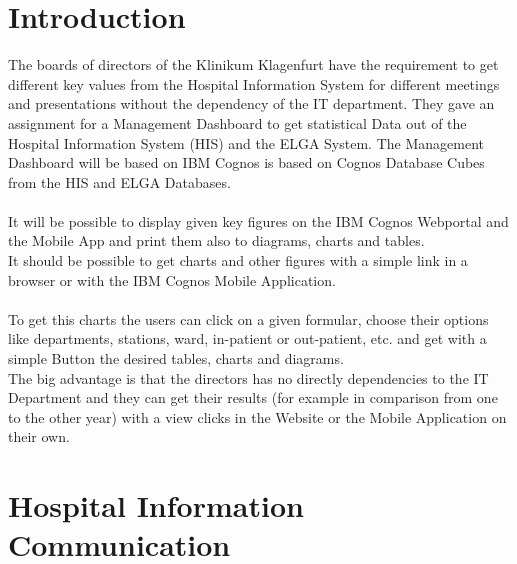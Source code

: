 \documentclass[a4paper]{article}
\begin{document}
	\section{Introduction}
	The boards of directors of the Klinikum Klagenfurt have the requirement to get
	different key values from the Hospital Information System for different
	meetings and presentations without the dependency of the IT department.
	They gave an assignment for a Management Dashboard to get statistical Data out
	of the Hospital Information System (HIS) and the ELGA System. The Management Dashboard
	will be based on IBM Cognos is based on Cognos Database Cubes from the HIS and
	ELGA Databases.\\
	\\
	It will be possible to display given key figures on the IBM Cognos
	Webportal and the Mobile App and print them also to diagrams, charts and tables.\\
	It should be possible to get charts and other figures with a simple link in
	a browser or with the IBM Cognos Mobile Application.\\
	\\
	To get this charts the users can click on a given formular, choose their
	options like departments, stations, ward, in-patient or out-patient, etc.
	and get with a simple Button the desired tables, charts and diagrams.\\
	The big advantage is that the directors has no directly dependencies to the IT
	Department and they can get their results (for example in comparison from one
	to the other year) with a view clicks in the Website or the Mobile Application
	on their own. 
	\newpage
	
	\section{Hospital Information Communication}
\end{document}
